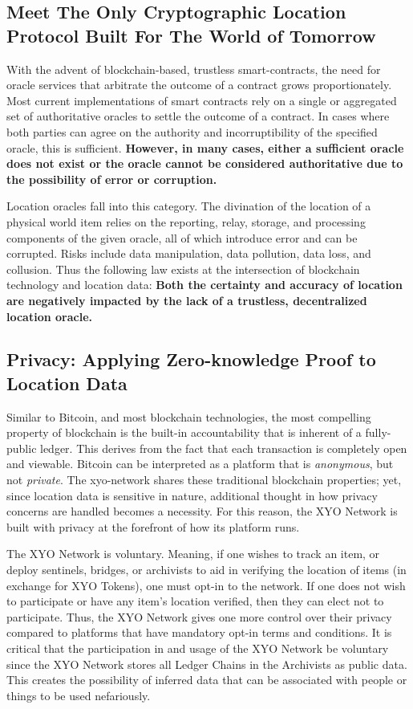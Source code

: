 \documentclass{article}
\begin{document}
\subsection {Meet The Only Cryptographic Location Protocol Built For The World of Tomorrow}
With the advent of blockchain-based, \gls{trustless} \glspl{smart-contract}, the need for \gls{oracle} services that arbitrate the outcome of a contract grows proportionately. Most current implementations of smart contracts rely on a single or aggregated set of authoritative oracles to settle the outcome of a contract. In cases where both parties can agree on the authority and incorruptibility of the specified oracle, this is sufficient. \textbf{However, in many cases, either a sufficient oracle does not exist or the oracle cannot be considered authoritative due to the possibility of error or corruption.}

Location oracles fall into this category. The divination of the location of a physical world item relies on the reporting, relay, storage, and processing components of the given oracle, all of which introduce error and can be corrupted. Risks include data manipulation, data pollution, data loss, and collusion. Thus the following law exists at the intersection of blockchain technology and location data: \textbf{Both the \gls{certainty} and \gls{accuracy} of location are negatively impacted by the lack of a \gls{trustless}, decentralized location oracle.}

\subsection{Privacy: Applying Zero-knowledge Proof to Location Data}

Similar to Bitcoin, and most blockchain technologies, the most compelling property of blockchain is the built-in accountability that is inherent of a fully-public ledger. This derives from the fact that each transaction is completely open and viewable. Bitcoin can be interpreted as a platform that is \textit{anonymous}, but not \textit{private}. The \Gls{xyo-network} shares these traditional blockchain properties; yet, since location data is sensitive in nature, additional thought in how privacy concerns are handled becomes a necessity. For this reason, the XYO Network is built with privacy at the forefront of how its platform runs.

The XYO Network is voluntary. Meaning, if one wishes to track an item, or deploy \Glspl{sentinel}, \Glspl{bridge}, or \Glspl{archivist} to aid in verifying the location of items (in exchange for XYO Tokens), one must opt-in to the network. If one does not wish to participate or have any item's location verified, then they can elect not to participate. Thus, the XYO Network gives one more control over their privacy compared to platforms that have mandatory opt-in terms and conditions. It is critical that the participation in and usage of the XYO Network be voluntary since the XYO Network stores all Ledger Chains in the Archivists as public data. This creates the possibility of inferred data that can be associated with people or things to be used nefariously.
\end{document}

